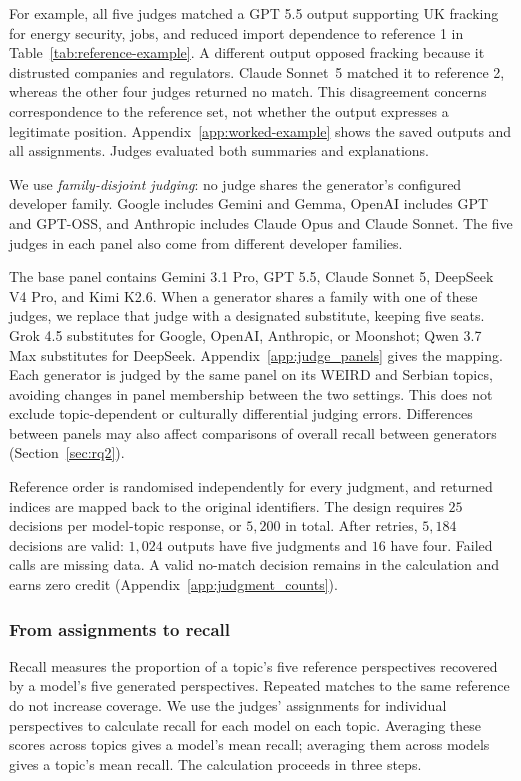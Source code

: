 \documentclass[11pt,a4paper]{article}
\begin{document}
For example, all five judges matched a GPT 5.5 output supporting UK fracking for energy security, jobs, and reduced import dependence to reference 1 in Table~\ref{tab:reference-example}. A different output opposed fracking because it distrusted companies and regulators. Claude Sonnet~5 matched it to reference 2, whereas the other four judges returned no match. This disagreement concerns correspondence to the reference set, not whether the output expresses a legitimate position. Appendix~\ref{app:worked-example} shows the saved outputs and all assignments. Judges evaluated both summaries and explanations.

We use \emph{family-disjoint judging}: no judge shares the generator's configured developer family. Google includes Gemini and Gemma, OpenAI includes GPT and GPT-OSS, and Anthropic includes Claude Opus and Claude Sonnet. The five judges in each panel also come from different developer families.

The base panel contains Gemini 3.1 Pro, GPT 5.5, Claude Sonnet 5, DeepSeek V4 Pro, and Kimi K2.6. When a generator shares a family with one of these judges, we replace that judge with a designated substitute, keeping five seats. Grok 4.5 substitutes for Google, OpenAI, Anthropic, or Moonshot; Qwen 3.7 Max substitutes for DeepSeek. Appendix~\ref{app:judge_panels} gives the mapping. Each generator is judged by the same panel on its WEIRD and Serbian topics, avoiding changes in panel membership between the two settings. This does not exclude topic-dependent or culturally differential judging errors. Differences between panels may also affect comparisons of overall recall between generators (Section~\ref{sec:rq2}).

Reference order is randomised independently for every judgment, and returned indices are mapped back to the original identifiers. The design requires $25$ decisions per model-topic response, or $5{,}200$ in total. After retries, $5{,}184$ decisions are valid: $1{,}024$ outputs have five judgments and $16$ have four. Failed calls are missing data. A valid no-match decision remains in the calculation and earns zero credit (Appendix~\ref{app:judgment_counts}).

\subsubsection{From assignments to recall}
\label{sec:recall}
Recall measures the proportion of a topic’s five reference perspectives recovered by a model’s five generated perspectives. Repeated matches to the same reference do not increase coverage. We use the judges’ assignments for individual perspectives to calculate recall for each model on each topic. Averaging these scores across topics gives a model’s mean recall; averaging them across models gives a topic’s mean recall. The calculation proceeds in three steps.
\end{document}
